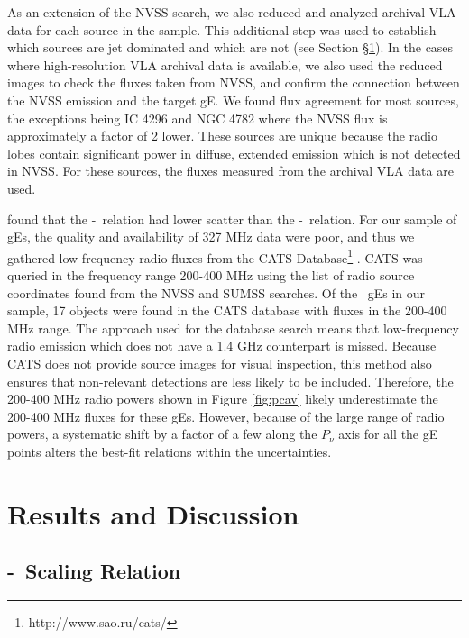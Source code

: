 \documentclass{emulateapj}
\begin{document}
As an extension of the NVSS search, we also reduced and analyzed
archival VLA data for each source in the sample. This additional step
was used to establish which sources are jet dominated and which are
not (see Section \S\ref{sec:r&d}). In the cases where high-resolution
VLA archival data is available, we also used the reduced images to
check the fluxes taken from NVSS, and confirm the connection between
the NVSS emission and the target gE. We found flux agreement for most
sources, the exceptions being IC 4296 and NGC 4782 where the NVSS flux
is approximately a factor of 2 lower. These sources are unique because
the radio lobes contain significant power in diffuse, extended
emission which is not detected in NVSS. For these sources, the fluxes
measured from the archival VLA data are used.

\citet{birzan08} found that the \pcav-\pthree\ relation had lower
scatter than the \pcav-\phigh\ relation. For our sample of gEs, the
quality and availability of 327 MHz data were poor, and thus we
gathered low-frequency radio fluxes from the CATS
Database\footnote{http://www.sao.ru/cats/} \citep{cats}. CATS was
queried in the frequency range 200-400 MHz using the list of radio
source coordinates found from the NVSS and SUMSS searches. Of the
\samp\ gEs in our sample, 17 objects were found in the CATS database
with fluxes in the 200-400 MHz range. The approach used for the
database search means that low-frequency radio emission which does not
have a 1.4 GHz counterpart is missed. Because CATS does not provide
source images for visual inspection, this method also ensures that
non-relevant detections are less likely to be included. Therefore, the
200-400 MHz radio powers shown in Figure \ref{fig:pcav} likely
underestimate the 200-400 MHz fluxes for these gEs. However, because
of the large range of radio powers, a systematic shift by a factor of
a few along the $P_{\nu}$ axis for all the gE points alters the
best-fit relations within the uncertainties.

\section{Results and Discussion}
\label{sec:r&d}

\subsection{\pjet-\prad\ Scaling Relation}
\label{sec:relation}
\end{document}
